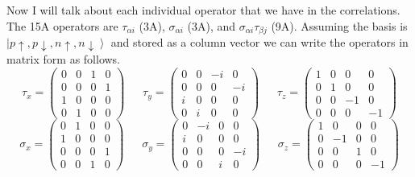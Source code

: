 \documentclass[12pt]{extarticle}
\begin{document}
Now I will talk about each individual operator that we have in the correlations. The 15A operators are $\tau_{\alpha i}$ (3A), $\sigma_{\alpha i}$ (3A), and $\sigma_{\alpha i}\tau_{\beta j}$ (9A). Assuming the basis is $\left|p\uparrow,p\downarrow,n\uparrow,n\downarrow\right>$ and stored as a column vector we can write the operators in matrix form as follows.
\begin{equation*}
\tau_x=
\begin{pmatrix}
    0 & 0 & 1 & 0 \\
    0 & 0 & 0 & 1 \\
    1 & 0 & 0 & 0 \\
    0 & 1 & 0 & 0
\end{pmatrix}
~~~~~~~\tau_y=
\begin{pmatrix}
    0 & 0 & -i & 0 \\
    0 & 0 & 0 & -i \\
    i & 0 & 0 & 0 \\
    0 & i & 0 & 0
\end{pmatrix}
~~~~~~~\tau_z=
\begin{pmatrix}
    1 & 0 & 0 & 0 \\
    0 & 1 & 0 & 0 \\
    0 & 0 & -1 & 0 \\
    0 & 0 & 0 & -1
\end{pmatrix}
\end{equation*}
\begin{equation*}
\sigma_x=
\begin{pmatrix}
    0 & 1 & 0 & 0 \\
    1 & 0 & 0 & 0 \\
    0 & 0 & 0 & 1 \\
    0 & 0 & 1 & 0
\end{pmatrix}
~~~~~~~\sigma_y=
\begin{pmatrix}
    0 & -i & 0 & 0 \\
    i & 0 & 0 & 0 \\
    0 & 0 & 0 & -i \\
    0 & 0 & i & 0
\end{pmatrix}
~~~~~~~\sigma_z=
\begin{pmatrix}
    1 & 0 & 0 & 0 \\
    0 & -1 & 0 & 0 \\
    0 & 0 & 1 & 0 \\
    0 & 0 & 0 & -1
\end{pmatrix}
\end{equation*}
\end{document}
